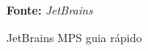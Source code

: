 \begin{figure}[h!]
\centering

\caption{\textmd{JetBrains MPS guia rápido}}
\label{fig:mpsfastrack}

\par\medskip\textbf{Fonte:} \textit{JetBrains} \par\medskip
\end{figure}
